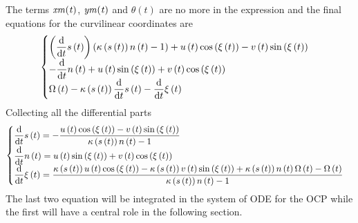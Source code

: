 %
The terms $\it xm(t)$, $\it ym(t)$ and $\theta(t)$ are no more in the expression and the final equations for the curvilinear coordinates are
%
\begin{equation}
\begin{cases} 
    \displaystyle
    \left( {\frac {\rm d}{{\rm d}t}}s \left( t\right)  \right)  \left( \kappa \left( s \left( t \right)  \right) n\left( t \right) -1 \right) +u \left( t \right) \cos \left( \xi\left( t \right)  \right) -v \left( t \right) \sin \left( \xi \left( t \right)  \right) \\ 
    \displaystyle
    -{\frac {\rm d}{{\rm d}t}}n\left( t \right) +u \left( t \right) \sin \left( \xi \left( t\right)  \right) +v \left( t \right) \cos \left( \xi \left( t\right)  \right) \\ 
    \displaystyle
    \Omega \left( t \right) -\kappa\left( s \left( t \right)  \right) {\frac {\rm d}{{\rm d}t}}s \left( t \right) -{\frac {\rm d}{{\rm d}t}}\xi \left( t \right) 
\end{cases}
\end{equation}
%
Collecting all the differential parts
%
\begin{equation}
    \begin{cases} 
    \displaystyle
    {\frac {\rm d}{{\rm d}t}}s \left( t \right) =-{\frac {u \left( t \right) \cos \left( \xi \left( t \right) \right) -v \left( t \right) \sin \left( \xi \left( t \right) \right) }{\kappa \left( s \left( t \right)  \right) n \left( t\right) -1}}\\
    \displaystyle 
    {\frac {\rm d}{{\rm d}t}}n \left( t\right) =u \left( t \right) \sin \left( \xi \left( t \right) \right) +v \left( t \right) \cos \left( \xi \left( t \right) \right) \\
    \displaystyle
    {\frac {\rm d}{{\rm d}t}}\xi \left( t \right) ={\frac {\kappa \left( s \left( t \right)  \right) u \left( t \right) \cos \left( \xi \left( t \right)  \right) -\kappa \left( s\left( t \right)  \right) v \left( t \right) \sin \left( \xi \left( t\right)  \right) +\kappa \left( s \left( t \right)  \right) n \left( t \right) \Omega \left( t \right) -\Omega \left( t \right) }{\kappa \left( s \left( t \right)  \right) n \left( t \right) -1}}
    \end{cases} 
    \label{eq:CurvCoord}
\end{equation}
%
The last two equation will be integrated in the system of ODE for the OCP while the first will have a central role in the following section.
%